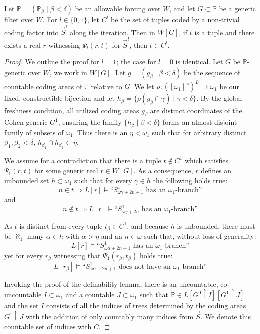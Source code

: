 \documentclass[10pt,a4paper]{amsart}
\begin{document}
\begin{lemma} \label{Lemma:NoUnwantedCodes}
Let $\mathbb{P} = (\mathbb{P}_\beta \mid \beta < \delta)$ be an allowable forcing over $W$, and let $G \subset \mathbb{P}$ be a generic filter over $W$. For $l \in \{0,1\}$, let $C^l$ be the set of tuples coded by a non-trivial coding factor into $\vec{S}^l$ along the iteration. Then in $W[G]$, if $t$ is a tuple and there exists a real $r$ witnessing $\Psi_l(r, t)$ for $\vec{S}^l$, then $t \in C^l$.
\end{lemma}

\begin{proof}
We outline the proof for $l=1$; the case for $l=0$ is identical. Let $G$ be $\mathbb{P}$-generic over $W$, we work in $W[G]$. Let $g= (g_{\beta} \mid \beta < \delta)$ be the sequence of countable coding areas of $\mathbb{P}$ relative to $G$. We let $\rho: ([\omega_1]^{\omega})^L \rightarrow \omega_1$ be our fixed, constructible bijection and let $h_{\beta}= \{\rho(g_{\beta} \cap \gamma) \mid \gamma < \delta\}$. By the global freshness condition, all utilized coding areas $g_{\beta}$ are distinct coordinates of the Cohen generic $G^1$, ensuring the family $\{h_{\beta} \mid \beta < \delta\}$ forms an almost disjoint family of subsets of $\omega_1$. Thus there is an $\eta < \omega_1$ such that for arbitrary distinct $\beta_1, \beta_2 < \delta$, $h_{\beta_1}\cap h_{\beta_2} \subset \eta$.

We assume for a contradiction that there is a tuple $t \notin C^1$ which satisfies $\Psi_1(r, t)$ for some generic real $r \in W[G]$. As a consequence, $r$ defines an unbounded set $h \subset \omega_1$ such that for every $\gamma \in h$ the following holds true:
$$n \in t \Rightarrow L[r] \models \text{``}S^1_{\omega \gamma + 2n+1} \text{ has an } \omega_1\text{-branch''}$$
and
$$n \notin t \Rightarrow L[r] \models \text{``}S^1_{\omega \gamma + 2n} \text{ has an } \omega_1\text{-branch''}$$

As $t$ is distinct from every tuple $t_\beta \in C^1$, and because $h$ is unbounded, there must be $\aleph_1$-many $\alpha \in h$ with $\alpha > \eta$ and an $n \in \omega$ such that, without loss of generality:
$$L[r] \models \text{``}S^1_{\omega \alpha + 2n+1} \text{ has an } \omega_1\text{-branch''}$$
yet for every $r_{\beta}$ witnessing that $\Psi_1(r_{\beta}, t_{\beta})$ holds true:
$$L[r_{\beta}] \models \text{``}S^1_{\omega \alpha + 2n+1} \text{ does not have an } \omega_1\text{-branch''}$$

Invoking the proof of the definability lemma, there is an uncountable, co-uncountable $I \subset \omega_1$ and a countable $J \subset \omega_1$ such that $\mathbb{P} \in L[G^0 \restriction I][G^1 \restriction J]$ and the set $I$ consists of all the indices of trees determined by the coding areas $G^1 \restriction J$ with the addition of only countably many indices from $\vec{S}$. We denote this countable set of indices with $C$.


\end{proof}
\end{document}

